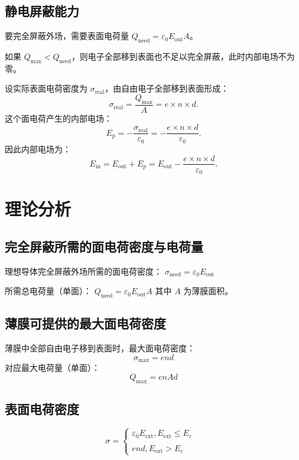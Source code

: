 \documentclass{article}
\begin{document}
\subsection{静电屏蔽能力}

要完全屏蔽外场，需要表面电荷量 $ Q_\text{need} = \varepsilon_0 E_\text{out} A $。

如果 $ Q_\text{max} < Q_\text{need} $，则电子全部移到表面也不足以完全屏蔽，此时内部电场不为零。



设实际表面电荷密度为 $ \sigma_\text{real} $，由自由电子全部移到表面形成：
$$\sigma_\text{real} = \frac{Q_\text{max}}{A} = e \times n \times d.$$
这个面电荷产生的内部电场：
$$E_p = -\frac{\sigma_\text{real}}{\varepsilon_0} = -\frac{e \times n \times d}{\varepsilon_0}.$$
因此内部电场为：
$$E_\text{in} = E_\text{out} + E_p = E_\text{out} - \frac{e \times n \times d}{\varepsilon_0}.$$


\section{理论分析}

\subsection{完全屏蔽所需的面电荷密度与电荷量}

理想导体完全屏蔽外场所需的面电荷密度：
$\sigma_{\text{need}} = \varepsilon_0 E_{\text{out}}$

所需总电荷量（单面）：
$Q_{\text{need}} = \varepsilon_0 E_{\text{out}} A$
其中 $ A $ 为薄膜面积。



\subsection{薄膜可提供的最大面电荷密度}

薄膜中全部自由电子移到表面时，最大面电荷密度：
$$
\sigma_{\max} = e n d
$$
对应最大电荷量（单面）：
$$
Q_{\max} = e n A d
$$




\subsection{表面电荷密度}

$$\sigma=\begin{cases}\varepsilon_0E_{\mathrm{ext}},E_{\mathrm{ext}}\leq E_c\\\\end,E_{\mathrm{ext}}>E_c&\end{cases}$$
\end{document}
